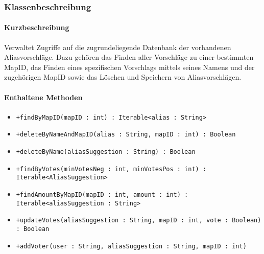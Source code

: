 \subsubsection*{Klassenbeschreibung}%
\paragraph*{Kurzbeschreibung}
Verwaltet Zugriffe auf die zugrundeliegende Datenbank der vorhandenen Aliasvorschläge.
Dazu gehören das Finden aller Vorschläge zu einer bestimmten MapID, das Finden eines spezifischen Vorschlags mittels 
seines Namens und der zugehörigen MapID sowie das Löschen und Speichern von Aliasvorschlägen.
\paragraph*{Enthaltene Methoden}
\begin{itemize}
    \item \texttt{+findByMapID(mapID : int) : Iterable<alias : String>}
    \item \texttt{+deleteByNameAndMapID(alias : String, mapID : int) : Boolean}
    \item \texttt{+deleteByName(aliasSuggestion : String) : Boolean}
    \item \texttt{+findByVotes(minVotesNeg : int, minVotesPos : int) : Iterable<AliasSuggestion>}
    \item \texttt{+findAmountByMapID(mapID : int, amount : int) : Iterable<aliasSuggestion : String>}
    \item \texttt{+updateVotes(aliasSuggestion : String, mapID : int, vote : Boolean) : Boolean}
    \item \texttt{+addVoter(user : String, aliasSuggestion : String, mapID : int)}
\end{itemize}
